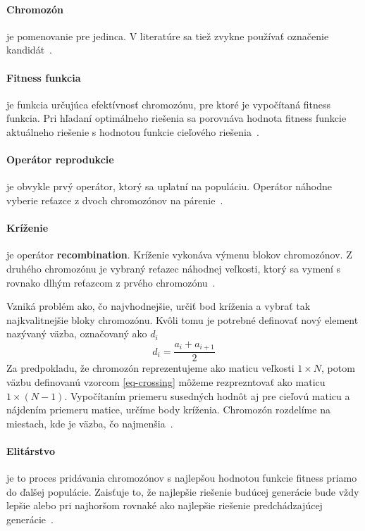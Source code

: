 \documentclass[a4paper,slovak,12pt,appendix]{article}
\begin{document}
\paragraph{Chromozón} je pomenovanie pre jedinca. V literatúre sa tiež zvykne
používať označenie kandidát~\cite{Arun2016}.

\paragraph{Fitness funkcia} je funkcia určujúca efektívnosť chromozónu, pre
ktoré je vypočítaná fitness funkcia. Pri hľadaní optimálneho riešenia sa
porovnáva hodnota fitness funkcie aktuálneho riešenie s hodnotou funkcie
cieľového riešenia~\cite{Chavan2015, Simonova2007}.

\paragraph{Operátor reprodukcie} je obvykle prvý operátor, ktorý sa uplatní na
populáciu. Operátor náhodne vyberie reťazce z dvoch chromozónov na
párenie~\cite{Chavan2015}.

\paragraph{Kríženie} je operátor \textbf{recombination}. Kríženie vykonáva
výmenu blokov chromozónov. Z druhého chromozónu je vybraný reťazec náhodnej
veľkosti, ktorý sa vymení s rovnako dlhým reťazcom z prvého
chromozónu~\cite{Chavan2015}.

Vzniká problém ako, čo najvhodnejšie, určiť bod kríženia a vybrať tak
najkvalitnejšie bloky chromozónu. Kvôli tomu je potrebné definovať nový element
nazývaný väzba, označovaný ako $d_i$
\begin{equation}
  d_i = \frac{a_i + a_{i+1}}{2}
  \label{eq-crossing}
\end{equation}
Za predpokladu, že chromozón reprezentujeme ako maticu veľkosti $1 \times N$,
potom väzbu definovanú vzorcom \ref{eq-crossing} môžeme rezprezntovať ako
maticu $1 \times (N-1)$. Vypočítaním priemeru susedných hodnôt aj pre cieľovú
maticu a nájdením priemeru matice, určíme body kríženia. Chromozón rozdelíme na
miestach, kde je väzba, čo najmenšia~\cite{Simonova2007}.

\paragraph{Elitárstvo} je to proces pridávania chromozónov s najlepšou hodnotou
funkcie fitness priamo do ďalšej populácie. Zaisťuje to, že najlepšie riešenie
budúcej generácie bude vždy lepšie alebo pri najhoršom rovnaké ako najlepšie
riešenie predchádzajúcej generácie~\cite{Deolekar2016}.
\end{document}
